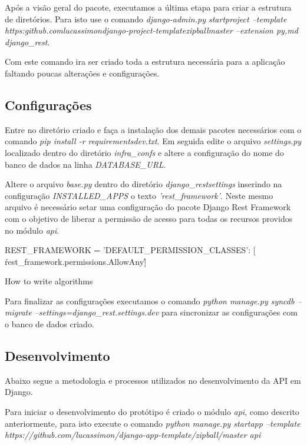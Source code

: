   Após a visão geral do pacote, executamos a última etapa para criar a estrutura de diretórios. Para isto use o comando
  \textit{django-admin.py startproject --template https:\/\/github.com\/lucassimon\/django-project-template\/zipball\/master --extension py,md django\_rest}.
  
  Com este comando ira ser criado toda a estrutura necessária para a aplicação faltando poucas alterações e configurações.
  
\subsection{Configurações}

  Entre no diretório criado e faça a instalação dos demais pacotes necessários com o comando \textit{pip install -r requirements\/dev.txt}.
  Em seguida edite o arquivo \textit{settings.py} localizado dentro do diretório \textit{infra\_confs\/} e altere a configuração
  do nome do banco de dados na linha \textit{DATABASE\_URL}.
  
  Altere o arquivo \textit{base.py} dentro do diretório \textit{django\_rest\/settings\/} inserindo na configuração \textit{INSTALLED\_APPS}
  o texto \textit{'rest\_framework'}. Neste mesmo arquivo é necessário setar uma configuração do pacote Django Rest Framework
  com o objetivo de liberar a permissão de acesso para todas os recursos providos no módulo \textit{api}.
  
  \begin{algorithm}[H]
  REST\_FRAMEWORK = {
       'DEFAULT\_PERMISSION\_CLASSES': [
          \'rest\_framework.permissions.AllowAny\'
       ]
  }
  \caption{How to write algorithms}
  \end{algorithm}
  
  Para finalizar as configurações executamos o comando \textit{python manage.py syncdb --migrate --settings=django\_rest.settings.dev}
  para sincronizar as configurações com o banco de dados criado.
  
  

\subsection{Desenvolvimento}

  Abaixo segue a metodologia e processos utilizados no desenvolvimento da API em Django.
  
  Para iniciar o desenvolvimento do protótipo é criado o módulo \textit{api}, como descrito anteriormente,
  para isto execute o comando \textit{python manage.py startapp --template https://github.com/lucassimon/django-app-template/zipball/master api}
  
